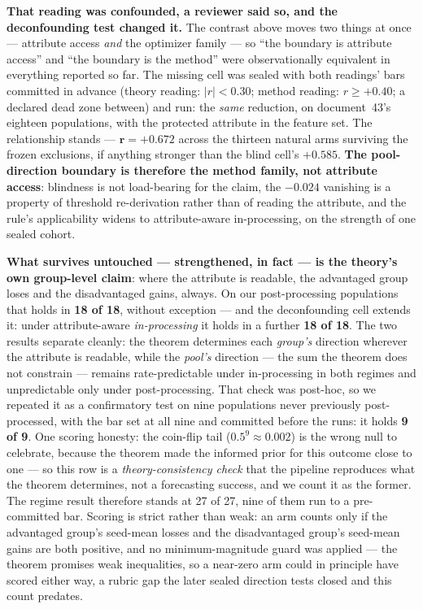 \documentclass[9pt,conference]{IEEEtran}
\begin{document}
\textbf{That reading was confounded, a reviewer said so, and the deconfounding test
changed it.} The contrast above moves two things at once --- attribute access \emph{and}
the optimizer family --- so ``the boundary is attribute access'' and ``the boundary is
the method'' were observationally equivalent in everything reported so far. The missing
cell was sealed with both readings' bars committed in advance (theory reading:
$|r| < 0.30$; method reading: $r \ge +0.40$; a declared dead zone between) and run:
the \emph{same} reduction, on document~43's eighteen populations, with the protected
attribute in the feature set. The relationship stands --- $\mathbf{r = +0.672}$ across
the thirteen natural arms surviving the frozen exclusions, if anything stronger than the
blind cell's $+0.585$. \textbf{The pool-direction boundary is therefore the method
family, not attribute access}: blindness is not load-bearing for the claim, the
$-0.024$ vanishing is a property of threshold re-derivation rather than of reading the
attribute, and the rule's applicability widens to attribute-aware in-processing, on
the strength of one sealed cohort.

\textbf{What survives untouched --- strengthened, in fact --- is the theory's own
group-level claim}: where the attribute is readable, the advantaged group loses and the
disadvantaged gains, always. On our post-processing populations that holds in
\textbf{18 of 18}, without exception --- and the deconfounding cell extends it: under
attribute-aware \emph{in-processing} it holds in a further \textbf{18 of 18}. The two
results separate cleanly: the theorem determines each \emph{group's} direction wherever
the attribute is readable, while the \emph{pool's} direction --- the sum the theorem
does not constrain --- remains rate-predictable under in-processing in both regimes and
unpredictable only under post-processing. That check was
post-hoc, so we repeated it as a confirmatory test on nine populations never previously
post-processed, with the bar set at all nine and committed before the runs: it holds \textbf{9
of 9}. One scoring honesty: the coin-flip tail ($0.5^9 \approx 0.002$) is the wrong null
to celebrate, because the theorem made the informed prior for this outcome close to one
--- so this row is a \emph{theory-consistency check} that the pipeline reproduces what
the theorem determines, not a forecasting success, and we count it as the former. The
regime result therefore stands at 27 of 27, nine of them run to a pre-committed bar.
Scoring is strict rather than weak: an arm counts only if the advantaged group's seed-mean
losses and the disadvantaged group's seed-mean gains are both positive, and no
minimum-magnitude guard was applied --- the theorem promises weak inequalities, so a
near-zero arm could in principle have scored either way, a rubric gap the later sealed
direction tests closed and this count predates.
\end{document}
